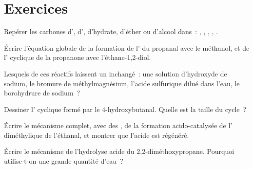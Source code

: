 \section{Exercices}

\begin{exercise}[$\star$]\label{exo:b1:acetals-protection:1}
Repérer les carbones d', d', d'hydrate, d'éther ou
d'alcool dans~:
, , , ,
.
\end{exercise}

\begin{exercise}[$\star$]\label{exo:b1:acetals-protection:2}
Écrire l'équation globale de la formation de l' du propanal avec
le méthanol, et de l' cyclique de la propanone avec
l'éthane-1,2-diol.
\end{exercise}

\begin{exercise}[$\star$]\label{exo:b1:acetals-protection:3}
Lesquels de ces réactifs laissent un  inchangé~: une solution
d'hydroxyde de sodium, le bromure de méthylmagnésium, l'acide sulfurique
dilué dans l'eau, le borohydrure de sodium~?
\end{exercise}

\begin{exercise}[$\star$]\label{exo:b1:acetals-protection:4}
Dessiner l' cyclique formé par le 4-hydroxybutanal. Quelle est
la taille du cycle~?
\end{exercise}

\begin{exercise}[$\star\star$]\label{exo:b1:acetals-protection:5}
Écrire le mécanisme complet, avec des , de la formation
acido-catalysée de l' diméthylique de l'éthanal, et montrer que
l'acide est régénéré.
\end{exercise}

\begin{exercise}[$\star\star$]\label{exo:b1:acetals-protection:6}
Écrire le mécanisme de l'hydrolyse acide du
2,2-diméthoxypropane. Pourquoi utilise-t-on une grande quantité d'eau~?
\end{exercise}

